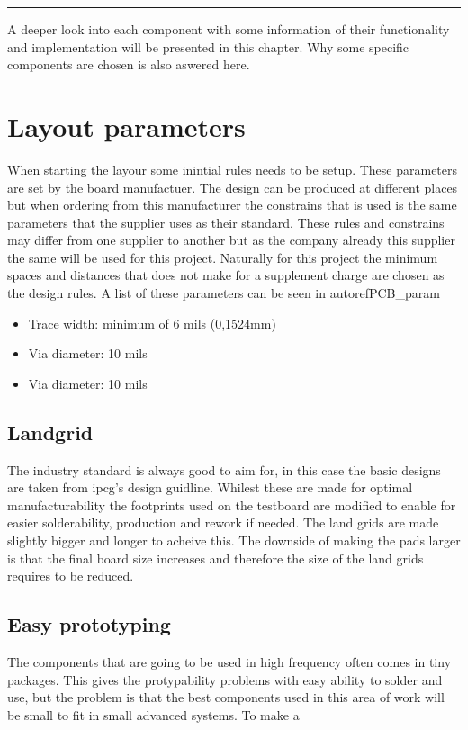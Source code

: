 
\vspace{-10ex}%
\rule{\textwidth}{0.3pt}
\vspace{10ex}
A deeper look into each component with some information of their functionality and implementation will be presented in this chapter. Why some specific components are chosen is also aswered here. 


\section{Layout parameters}

When starting the layour some inintial rules needs to be setup. These parameters are set by the board manufactuer.
The design can be produced at different places but when ordering from this manufacturer the constrains that is used is the same parameters that the supplier uses as their standard.
These rules and constrains may differ from one supplier to another but as the company already this supplier the same will be used for this project.
Naturally for this project the minimum spaces and distances that does not make for a supplement charge are chosen as the design rules. A list of these parameters can be seen in  autoref{PCB_param}

\begin{itemize}
\item Trace width: minimum of 6 mils (0,1524mm) 
\item Via diameter: 10 mils
\item Via diameter: 10 mils

\end{itemize}
 
\subsection{Landgrid}
The industry standard is always good to aim for, in this case the basic designs are taken from \gls{ipcg}'s design guidline\cite{ipcg}. Whilest these are made for optimal manufacturability the footprints used on the testboard are modified to enable for easier solderability, production and rework if needed. The land grids are made slightly bigger and longer to acheive this. The downside of making the pads larger is that the final board size increases and therefore the size of the land grids requires to be reduced.

\subsection{Easy prototyping}
The components that are going to be used in high frequency often comes in tiny packages. This gives the protypability problems with easy ability to solder and use, but the problem is that the best components used in this area of work will be small to fit in small advanced systems. To make a

